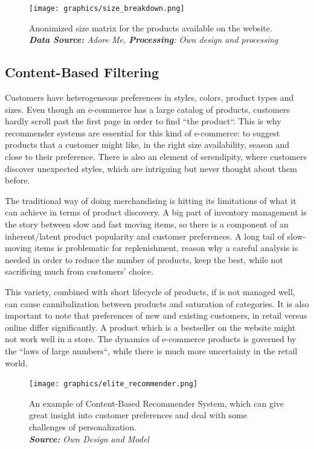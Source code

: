 \documentclass[12pt]{article}
\begin{document}
\begin{figure}[!ht]
	\centering
	\texttt{[image: graphics/size\_breakdown.png]}%
	\caption{Anonimized size matrix for the products available on the website. \\
		\textit{\textbf{Data Source:} Adore Me, \textbf{Processing}: Own design and processing}}
\end{figure}


\subsection{Content-Based Filtering}

Customers have heterogeneous preferences in styles, colors, product types and sizes. Even though an e-commerce has a large catalog of products, customers hardly scroll past the first page in order to find ``the product``. This is why recommender systems are essential for this kind of e-commerce: to suggest products that a customer might like, in the right size availability, season and close to their preference. There is also an element of serendipity, where customers discover unexpected styles, which are intriguing but never thought about them before.


The traditional way of doing merchandising is hitting its limitations of what it can achieve in terms of product discovery. A big part of inventory management is the story between slow and fast moving items, so there is a component of an inherent/latent product popularity and customer preferences. A long tail of slow-moving items is problematic for replenishment, reason why a careful analysis is needed in order to reduce the number of products, keep the best, while not sacrificing much from customers' choice.

This variety, combined with short lifecycle of products, if is not managed well, can cause cannibalization between products and saturation of categories. It is also important to note that preferences of new and existing customers, in retail versus online differ significantly. A product which is a bestseller on the website might not work well in a store. The dynamics of e-commerce products is governed by the ``laws of large numbers``, while there is much more uncertainty in the retail world.

\begin{figure}[!ht]
	\flushleft
	\texttt{[image: graphics/elite\_recommender.png]}%
	\caption{An example of Content-Based Recommender System, which can give great insight into customer preferences and deal with some challenges of personalization.  \\
		\textit{\textbf{Source:} Own Design and Model}}
\end{figure}
\end{document}
